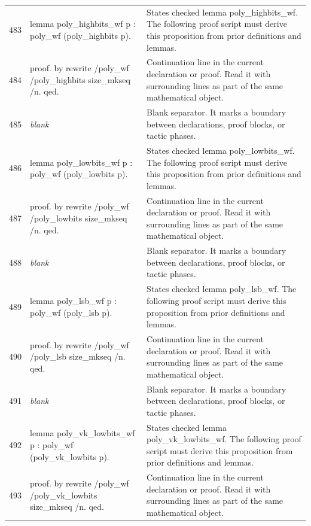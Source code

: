 \documentclass[10pt]{article}
\begin{document}
\begin{longtable}{r L{0.53\textwidth} L{0.37\textwidth}}
483 & {\ttfamily\scriptsize lemma poly\_highbits\_wf p : poly\_wf (poly\_highbits p).} & States checked lemma poly\_highbits\_wf.  The following proof script must derive this proposition from prior definitions and lemmas. \\
484 & {\ttfamily\scriptsize proof. by rewrite /poly\_wf /poly\_highbits size\_mkseq /n. qed.} & Continuation line in the current declaration or proof.  Read it with surrounding lines as part of the same mathematical object. \\
485 & {\ttfamily\scriptsize \emph{blank}} & Blank separator.  It marks a boundary between declarations, proof blocks, or tactic phases. \\
486 & {\ttfamily\scriptsize lemma poly\_lowbits\_wf p : poly\_wf (poly\_lowbits p).} & States checked lemma poly\_lowbits\_wf.  The following proof script must derive this proposition from prior definitions and lemmas. \\
487 & {\ttfamily\scriptsize proof. by rewrite /poly\_wf /poly\_lowbits size\_mkseq /n. qed.} & Continuation line in the current declaration or proof.  Read it with surrounding lines as part of the same mathematical object. \\
488 & {\ttfamily\scriptsize \emph{blank}} & Blank separator.  It marks a boundary between declarations, proof blocks, or tactic phases. \\
489 & {\ttfamily\scriptsize lemma poly\_lsb\_wf p : poly\_wf (poly\_lsb p).} & States checked lemma poly\_lsb\_wf.  The following proof script must derive this proposition from prior definitions and lemmas. \\
490 & {\ttfamily\scriptsize proof. by rewrite /poly\_wf /poly\_lsb size\_mkseq /n. qed.} & Continuation line in the current declaration or proof.  Read it with surrounding lines as part of the same mathematical object. \\
491 & {\ttfamily\scriptsize \emph{blank}} & Blank separator.  It marks a boundary between declarations, proof blocks, or tactic phases. \\
492 & {\ttfamily\scriptsize lemma poly\_vk\_lowbits\_wf p : poly\_wf (poly\_vk\_lowbits p).} & States checked lemma poly\_vk\_lowbits\_wf.  The following proof script must derive this proposition from prior definitions and lemmas. \\
493 & {\ttfamily\scriptsize proof. by rewrite /poly\_wf /poly\_vk\_lowbits size\_mkseq /n. qed.} & Continuation line in the current declaration or proof.  Read it with surrounding lines as part of the same mathematical object. \\

\end{longtable}
\end{document}
